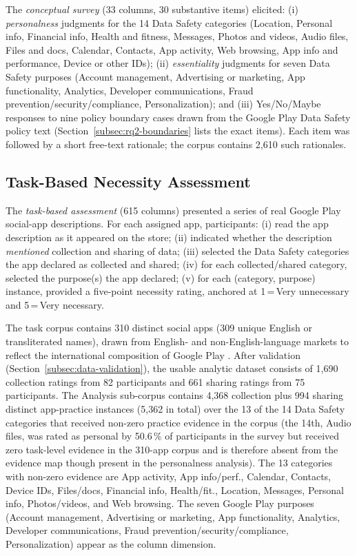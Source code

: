 \documentclass[11pt,a4paper]{article}
\begin{document}
The \emph{conceptual survey} (33 columns, 30 substantive items)
elicited:
(i) \emph{personalness} judgments for the 14 Data Safety categories
(Location, Personal info, Financial info, Health and fitness, Messages,
Photos and videos, Audio files, Files and docs, Calendar, Contacts, App
activity, Web browsing, App info and performance, Device or other IDs);
(ii) \emph{essentiality} judgments for seven Data Safety purposes
(Account management, Advertising or marketing, App functionality,
Analytics, Developer communications, Fraud prevention/security/compliance,
Personalization); and
(iii) Yes/No/Maybe responses to nine policy boundary cases drawn from
the Google Play Data Safety policy text (Section~\ref{subsec:rq2-boundaries}
lists the exact items). Each item was followed by a short free-text
rationale; the corpus contains 2{,}610 such rationales.

\subsection{Task-Based Necessity Assessment}
\label{subsec:task}

The \emph{task-based assessment} (615 columns) presented a series of
real Google Play social-app descriptions. For each assigned app,
participants:
(i) read the app description as it appeared on the store;
(ii) indicated whether the description \emph{mentioned} collection and
sharing of data;
(iii) selected the Data Safety categories the app declared as collected
and shared;
(iv) for each collected/shared category, selected the purpose(s) the
app declared;
(v) for each (category, purpose) instance, provided a five-point
necessity rating, anchored at 1\,=\,Very unnecessary and 5\,=\,Very
necessary.

The task corpus contains 310 distinct social apps (309 unique English
or transliterated names), drawn from English- and non-English-language
markets to reflect the international composition of Google Play
\citep{kollnig:etal:2022,bhagavatula:etal:2023}. After validation
(Section~\ref{subsec:data-validation}), the usable analytic dataset
consists of 1{,}690 collection ratings from 82 participants and 661
sharing ratings from 75 participants. The Analysis sub-corpus contains
4{,}368 collection plus 994 sharing distinct app-practice instances
(5{,}362 in total) over the 13 of the 14 Data Safety categories that
received non-zero practice evidence in the corpus (the 14th, Audio
files, was rated as personal by 50.6\,\% of participants in the
survey but received zero task-level evidence in the 310-app corpus
and is therefore absent from the evidence map though present in the
personalness analysis). The 13 categories with non-zero evidence are
App activity, App info/perf., Calendar, Contacts, Device IDs,
Files/docs, Financial info, Health/fit., Location, Messages, Personal
info, Photos/videos, and Web browsing. The seven Google Play purposes
(Account management, Advertising or marketing, App functionality,
Analytics, Developer communications, Fraud prevention/security/compliance,
Personalization) appear as the column dimension.
\end{document}
